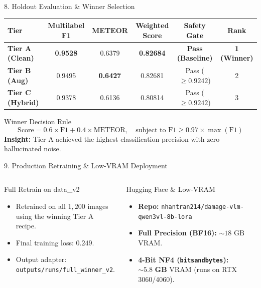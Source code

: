 \documentclass[aspectratio=169]{beamer}
\begin{document}
\begin{frame}{8. Holdout Evaluation \& Winner Selection}
  \begin{table}[h]\small
    \centering
    \begin{tabular}{lccccc}
      \toprule
      \textbf{Tier} & \textbf{Multilabel F1} & \textbf{METEOR} & \textbf{Weighted Score} & \textbf{Safety Gate} & \textbf{Rank} \\
      \midrule
      \textbf{Tier A (Clean)} & \textbf{0.9528} & 0.6379 & \textbf{0.82684} & \textbf{Pass (Baseline)} & \textbf{1 (Winner)} \\
      \textbf{Tier B (Aug)} & 0.9495 & \textbf{0.6427} & 0.82681 & Pass ($\ge 0.9242$) & 2 \\
      \textbf{Tier C (Hybrid)} & 0.9378 & 0.6136 & 0.80814 & Pass ($\ge 0.9242$) & 3 \\
      \bottomrule
    \end{tabular}
  \end{table}
  \vspace{0.2cm}
  \begin{block}{Winner Decision Rule}
    $$\text{Score} = 0.6 \times \text{F1} + 0.4 \times \text{METEOR}, \quad \text{subject to } \text{F1} \ge 0.97 \times \max(\text{F1})$$
    \textbf{Insight:} Tier A achieved the highest classification precision with zero hallucinated noise.
  \end{block}
\end{frame}

\begin{frame}{9. Production Retraining \& Low-VRAM Deployment}
  \begin{columns}
    \begin{block}{Full Retrain on data\_v2}
      \begin{itemize}\small
        \item Retrained on all $1,200$ images using the winning Tier A recipe.
        \item Final training loss: $\mathbf{0.249}$.
        \item Output adapter: \texttt{outputs/runs/full\_winner\_v2}.
      \end{itemize}
    \end{block}
    \begin{block}{Hugging Face \& Low-VRAM}
      \begin{itemize}\small
        \item \textbf{Repo:} \texttt{nhantran214/damage-vlm-qwen3vl-8b-lora}
        \item \textbf{Full Precision (BF16):} $\sim 18\text{ GB}$ VRAM.
        \item \textbf{4-Bit NF4 (\texttt{bitsandbytes}):} $\sim \mathbf{5.8\text{ GB}}$ VRAM (runs on RTX 3060/4060).
      \end{itemize}
    \end{block}
  \end{columns}
\end{frame}
\end{document}
